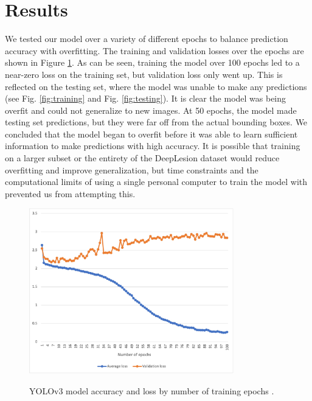\section{Results}
We tested our model over a variety of different epochs to balance prediction accuracy with overfitting. The training and validation losses over the epochs are shown in Figure \ref{fig:compare}. As can be seen, training the model over 100 epochs led to a near-zero loss on the training set, but validation loss only went up. This is reflected on the testing set, where the model was unable to make any predictions (see Fig. \ref{fig:training} and Fig. \ref{fig:testing}). It is clear the model was being overfit and could not generalize to new images. At 50 epochs, the model made testing set predictions, but they were far off from the actual bounding boxes. We concluded that the model began to overfit before it was able to learn sufficient information to make predictions with high accuracy. It is possible that training on a larger subset or the entirety of the DeepLesion dataset would reduce overfitting and improve generalization, but time constraints and the computational limits of using a single personal computer to train the model with prevented us from attempting this.


\begin{figure}
 \begin{center}
 \includegraphics[width=3.5in]{images/epochgraph.jpg}\\
 \caption{YOLOv3 model accuracy and loss by number of training epochs \cite{radiology_error}.}\label{fig:compare}
 \end{center}
\end{figure}

